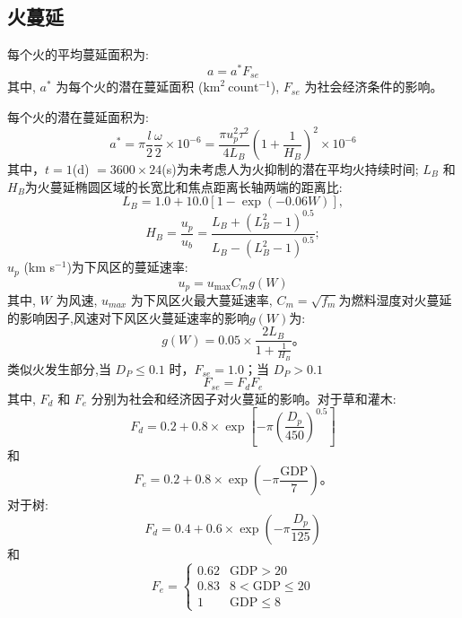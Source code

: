 \subsection{火蔓延}
每个火的平均蔓延面积为: 
\begin{equation}
a = a^* F_{se}
\end{equation}
%
其中, $a^*$ 为每个火的潜在蔓延面积 ($\text{km}^2~\text{count}^{-1}$), $F_{se}$ 为社会经济条件的影响。

每个火的潜在蔓延面积为:   
%
\begin{equation}
a^{*}=\pi \frac{l}{2} \frac{\omega}{2} \times 10^{-6}=\frac{\pi u_{p}^{2} \tau^{2}}{4 L_{B}}\left(1+\frac{1}{H_{B}}\right)^{2} \times 10^{-6}
\end{equation}
%
其中，$t = 1$(d) $= 3600\times24$(s)为未考虑人为火抑制的潜在平均火持续时间; $L_B$ 和 $H_B$为火蔓延椭圆区域的长宽比和焦点距离长轴两端的距离比:  
\begin{equation}
L_{B}=1.0+10.0\left[1-\exp (-0.06 W)\right],
\end{equation}
\begin{equation}
H_{B}=\frac{u_{p}}{u_{b}}=\frac{L_{B}+\left(L_{B}^{2}-1\right)^{0.5}}{L_{B}-\left(L_{B}^{2}-1\right)^{0.5}};
\end{equation}
$u_p$ (km s$^{-1}$)为下风区的蔓延速率:  
\begin{equation}
u_{p}=u_{\max } C_{m} g(W)
\end{equation}
%
其中, $W$ 为风速, $u_{max}$ 为下风区火最大蔓延速率, $C_{m}=\sqrt{f_{m}}$为燃料湿度对火蔓延的影响因子,风速对下风区火蔓延速率的影响$g(W)$为:  
\begin{equation}
g(W)=0.05 \times \frac{2 L_{B}}{1+\frac{1}{H_{B}}}。
\end{equation}
类似火发生部分,当 $D_P \leqslant 0.1$ 时，$F_{se} = 1.0$；当 $D_P > 0.1$
%
\begin{equation}
F_{se} = F_d F_e
\end{equation}  
%
其中, $F_d$ 和 $F_e$ 分别为社会和经济因子对火蔓延的影响。对于草和灌木:  
\begin{equation}
F_{d}=0.2+0.8 \times \exp \left[-\pi\left(\frac{D_{p}}{450}\right)^{0.5}\right]
\end{equation}
和  
\begin{equation}
F_{e}=0.2+0.8 \times \exp \left(-\pi \frac{\text{GDP}}{7}\right)。
\end{equation}
对于树:  
\begin{equation}
F_{d}=0.4+0.6 \times \exp \left(-\pi \frac{D_{p}}{125}\right)
\end{equation}
和  
\begin{equation}
F_{e}=\begin{cases}
0.62 & \text{GDP}>20 \\
0.83 & 8< \text{GDP} \leqslant 20 \\
1 & \text{GDP} \leqslant 8
\end{cases}
\end{equation}


